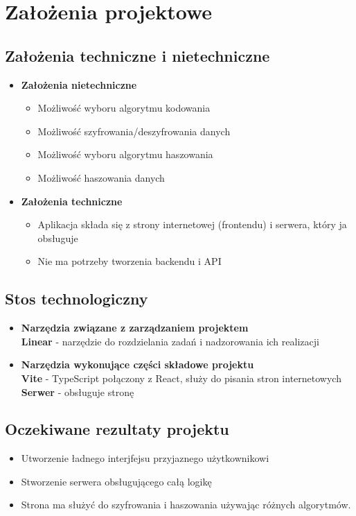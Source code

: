 \documentclass[12pt,a4paper]{article}
\begin{document}
\newpage
\section{Założenia projektowe}
\subsection{Założenia techniczne i nietechniczne}
	\begin{itemize}
	    \item \textbf{Założenia nietechniczne}
            \begin{itemize}
                \item Możliwość wyboru algorytmu kodowania
                \item Możliwość szyfrowania/deszyfrowania danych
                \item Możliwość wyboru algorytmu haszowania
                \item Możliwość haszowania danych
            \end{itemize}
        \item \textbf{Założenia techniczne}
            \begin{itemize}
                \item Aplikacja składa się z strony internetowej (frontendu) i serwera, który ja obsługuje
                \item Nie ma potrzeby tworzenia backendu i API
            \end{itemize}
	\end{itemize}

\subsection{Stos technologiczny}
	\begin{itemize}
	    \item \textbf{Narzędzia związane z zarządzaniem projektem}\\
            \textbf{Linear} - narzędzie do rozdzielania zadań i nadzorowania ich realizacji
        \item \textbf{Narzędzia wykonujące części składowe projektu}\\
            \textbf{Vite} - TypeScript połączony z React, służy do pisania stron internetowych\\
            \textbf{Serwer} - obsługuje stronę
	\end{itemize}

\subsection{Oczekiwane rezultaty projektu}
    \begin{itemize}
        \item Utworzenie ładnego interjfejsu przyjaznego użytkownikowi
        \item Stworzenie serwera obsługującego całą logikę
        \item Strona ma służyć do szyfrowania i haszowania używając różnych algorytmów.
    \end{itemize}
	
\end{document}
